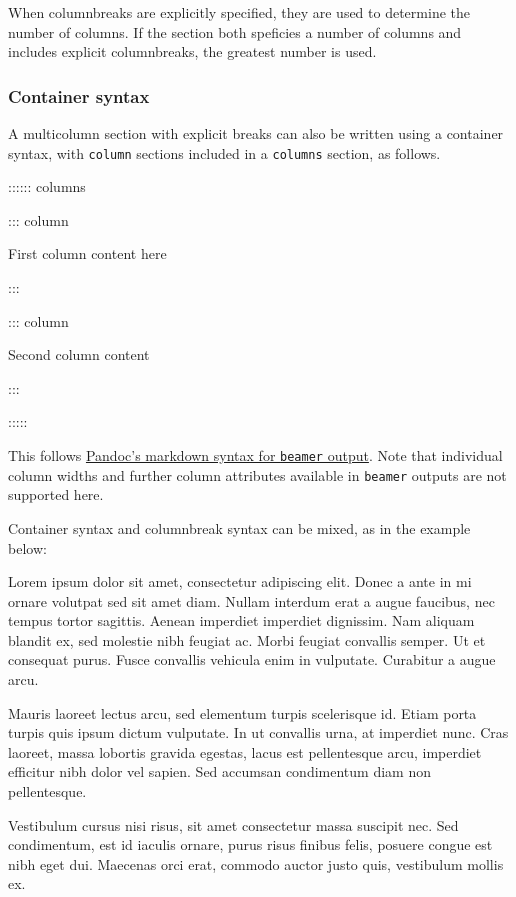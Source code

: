 \documentclass[
]{article}
\newenvironment{Shaded}{}{}
\newcommand{\NormalTok}[1]{#1}
\begin{document}
When columnbreaks are explicitly specified, they are used to determine
the number of columns. If the section both speficies a number of columns
and includes explicit columnbreaks, the greatest number is used.

\hypertarget{container-syntax}{%
\subsubsection{Container syntax}\label{container-syntax}}

A multicolumn section with explicit breaks can also be written using a
container syntax, with \texttt{column} sections included in a
\texttt{columns} section, as follows.

\begin{Shaded}
\begin{Highlighting}[]
\NormalTok{:::::: columns}

\NormalTok{::: column}

\NormalTok{First column content here}

\NormalTok{:::}

\NormalTok{::: column}

\NormalTok{Second column content}

\NormalTok{:::}

\NormalTok{:::::}
\end{Highlighting}
\end{Shaded}

This follows \href{https://pandoc.org/MANUAL.html\#columns}{Pandoc's
markdown syntax for \texttt{beamer} output}. Note that individual column
widths and further column attributes available in \texttt{beamer}
outputs are not supported here.

Container syntax and columnbreak syntax can be mixed, as in the example
below:

{\begin{multicols}{3}

Lorem ipsum dolor sit amet, consectetur adipiscing elit. Donec a ante in
mi ornare volutpat sed sit amet diam. Nullam interdum erat a augue
faucibus, nec tempus tortor sagittis. Aenean imperdiet imperdiet
dignissim. Nam aliquam blandit ex, sed molestie nibh feugiat ac. Morbi
feugiat convallis semper. Ut et consequat purus. Fusce convallis
vehicula enim in vulputate. Curabitur a augue arcu.

\columnbreak

Mauris laoreet lectus arcu, sed elementum turpis scelerisque id. Etiam
porta turpis quis ipsum dictum vulputate. In ut convallis urna, at
imperdiet nunc. Cras laoreet, massa lobortis gravida egestas, lacus est
pellentesque arcu, imperdiet efficitur nibh dolor vel sapien. Sed
accumsan condimentum diam non pellentesque.

\columnbreak

Vestibulum cursus nisi risus, sit amet consectetur massa suscipit nec.
Sed condimentum, est id iaculis ornare, purus risus finibus felis,
posuere congue est nibh eget dui. Maecenas orci erat, commodo auctor
justo quis, vestibulum mollis ex.

\end{multicols}
}
\end{document}
